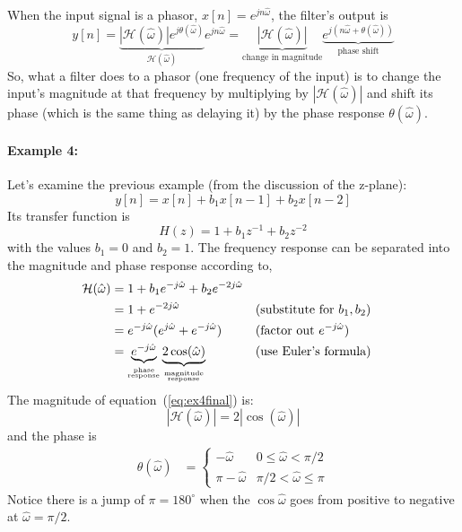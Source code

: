 When the input signal is a phasor, $x[n]=e^{jn\hat{\omega}}$, the
filter's output is
\begin{equation}
y[n] = \underbrace{|\mathcal{H}(\hat{\omega})|e^{j
    \theta(\hat{\omega})}}_{\mathcal{H}(\hat{\omega})} e^{jn\hat{\omega}}
= \underbrace{|\mathcal{H}(\hat{\omega})|}_{\text{change in magnitude}}
  \underbrace{e^{j(n\hat{\omega} +
      \theta(\hat{\omega}))}}_{\text{phase shift}}
\end{equation}
So, what a filter does to a phasor (one frequency of the input) is to
change the input's magnitude at that frequency by multiplying by
$|\mathcal{H}(\hat{\omega})|$ and shift its phase (which is the same
thing as delaying it) by the phase response $\theta(\hat{\omega})$.

\paragraph*{Example 4:}

Let's examine the previous example (from the discussion of the z-plane):
\begin{equation*}
y[n] = x[n] + b_1x[n-1] + b_2x[n-2]
\end{equation*}
Its transfer function is
\begin{equation*}
H(z)=1 + b_1z^{-1} + b_2z^{-2} 
\end{equation*}
with the values $b_1=0$ and $b_2=1$. The frequency response can be separated into the magnitude and phase response according to,
\begin{align}
\mathcal{H}(\hat{\omega}) &= 1 + b_1e^{-j\hat{\omega}} + b_2e^{-2j\hat{\omega}}
\label{eq:ff-2zthosimple} \\
&= 1 + e^{-2j\hat{\omega}}  && (\text{substitute for $b_1, b_2$}) \notag\\
&= e^{-j\hat{\omega}} (e^{j\hat{\omega}}  + e^{-j\hat{\omega}})  &&
 (\text{factor out $e^{-j\hat{\omega}} $}) \notag \\
&=\underbrace{e^{-j\hat{\omega}}}_{\stackrel{\text{phase}}{_\text{response}}} 
\underbrace{2\cos(\hat{\omega})}_{\stackrel{\text{magnitude}}{_\text{response}}}  &&
 (\text{use Euler's formula}) \label{eq:ex4final}
\end{align}
The magnitude of equation~(\ref{eq:ex4final}) is:
\begin{equation}
|\mathcal{H}(\hat{\omega})|=2|\cos(\hat{\omega})|
\label{eq:ff-z0ssimp}
\end{equation}
and the phase is 
\begin{align}
\theta(\hat{\omega})
              &= \left\{\begin{array}{rl}
                         -\hat{\omega} & 0 \leq \hat{\omega} < \pi/2\\
                         \pi-\hat{\omega} & \pi/2 < \hat{\omega} \leq \pi
                        \end{array}\right.
                        \label{eq:ff-z0phasesimp}
\end{align}
Notice there is a jump of $\pi=180^\circ$ when the $\cos\hat{\omega}$ goes from positive to negative at $\hat{\omega}=\pi/2$. 

